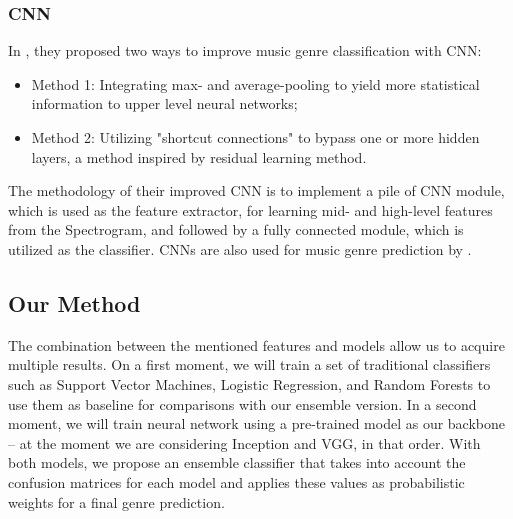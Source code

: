 \subsubsection{CNN}

In \citet{Zhang2016}, they proposed two ways to improve music genre classification with CNN:

\begin{itemize}
    \item Method 1: Integrating max- and average-pooling to yield more statistical information to upper level neural networks;
    \item Method 2: Utilizing "shortcut connections" to bypass one or more hidden layers, a method inspired by residual learning method.
\end{itemize}

The methodology of their improved CNN is to implement a pile of CNN module, which is used as the feature extractor, for learning mid- and high-level features from the Spectrogram, and followed by a fully connected module, which is utilized as the classifier. CNNs are also used for music genre prediction by \citet{Bahuleyan2018}.

\subsection{Our Method}

The combination between the mentioned features and models allow us to acquire multiple results. On a first moment, we will train a set of traditional classifiers such as Support Vector Machines, Logistic Regression, and Random Forests to use them as baseline for comparisons with our ensemble version. In a second moment, we will train neural network using a pre-trained model as our backbone -- at the moment we are considering Inception and VGG, in that order. With both models, we propose an ensemble classifier that takes into account the confusion matrices for each model and applies these values as probabilistic weights for a final genre prediction.

